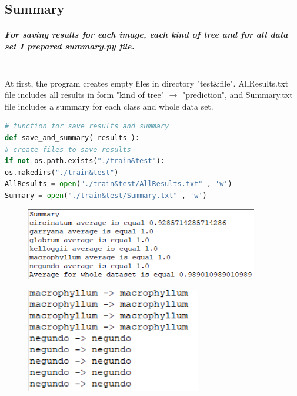 \documentclass[12pt]{article}
\begin{document}
\newpage

\subsection{Summary}

\subparagraph{
For saving results for each image, each kind of tree and for all data set I prepared summary.py file. \\\\
}

At first, the program creates empty files in directory "test\&file". AllResults.txt file includes all results in form "kind of tree"
$\rightarrow$
"prediction", and Summary.txt file includes a summary for each class and whole data set.

\begin{lstlisting}[language=Python]
# function for save results and summary
def save_and_summary( results ):
# create files to save results
if not os.path.exists("./train&test"):
os.makedirs("./train&test")
AllResults = open("./train&test/AllResults.txt" , 'w')
Summary = open("./train&test/Summary.txt" , 'w')
\end{lstlisting}

\begin{center}
\begin{figure}[h!]
\centering
\includegraphics[width = 4in]{summary_sample.png}
\end{figure}
\end{center}

\begin{center}
\begin{figure}[h!]
\centering
\includegraphics[width =3in]{allresults_sample.png}
\end{figure}
\end{center}
\end{document}
